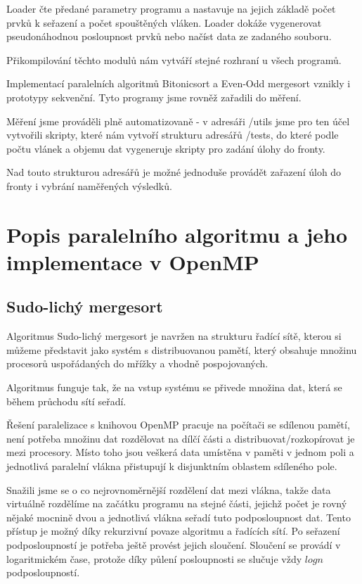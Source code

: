 \documentclass[12pt]{article}
\begin{document}
Loader čte předané parametry programu a nastavuje na jejich základě počet prvků k seřazení a počet
spouštěných vláken. Loader dokáže vygenerovat pseudonáhodnou posloupnost prvků nebo načíst data ze zadaného
souboru.

Přikompilování těchto modulů nám vytváří stejné rozhraní u všech programů.

Implementací paralelních algoritmů Bitonicsort a Even-Odd mergesort vznikly i prototypy sekvenční.
Tyto programy jsme rovněž zařadili do měření.

Měření jsme prováděli plně automatizovaně - v adresáři /utils jsme pro ten účel vytvořili skripty,
které nám vytvoří strukturu adresářů /tests, do které podle počtu vlánek a objemu dat vygeneruje
skripty pro zadání úlohy do fronty.

Nad touto strukturou adresářů je možné jednoduše provádět zařazení úloh do fronty i vybrání naměřených
výsledků.

\section{Popis paralelního algoritmu a jeho implementace v OpenMP}
\subsection{Sudo-lichý mergesort}
Algoritmus Sudo-lichý mergesort je navržen na strukturu řadící sítě, kterou si můžeme představit jako
systém s distribuovanou pamětí, který obsahuje množinu procesorů uspořádaných do mřížky a vhodně pospojovaných.

Algoritmus funguje tak, že na vstup systému se přivede množina dat, která se během průchodu sítí seřadí.

Řešení paralelizace s knihovou OpenMP pracuje na počítači se sdílenou pamětí, není potřeba množinu dat
rozdělovat na dílčí části a distribuovat/rozkopírovat je mezi procesory. Místo toho jsou veškerá data
umístěna v paměti v jednom poli a jednotlivá paralelní vlákna přistupují k disjunktním oblastem sdíleného
pole.

Snažili jsme se o co nejrovnoměrnější rozdělení dat mezi vlákna, takže data virtuálně rozdělíme na začátku
programu na stejné části, jejichž počet je rovný nějaké mocnině dvou a jednotlivá vlákna seřadí tuto podposloupnost
dat. Tento přístup je možný díky rekurzivní povaze algoritmu a řadících sítí.
Po seřazení podposloupností je potřeba ještě provést jejich sloučení. Sloučení se provádí v logaritmickém čase,
protože díky půlení posloupnosti se slučuje vždy \(log n\) podposloupností.
\end{document}
